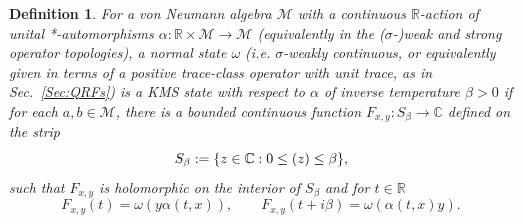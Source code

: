 \documentclass[sn-mathphys-num]{sn-jnl}%
\let\Im\relax
\DeclareMathOperator{\Im}{Im}
\newcommand{\CC}{\mathbb{C}}
\newcommand{\RR}{\mathbb{R}}
\newcommand{\MM}{\mathcal{M}}
\numberwithin{equation}{section}
\theoremstyle{thmstyleone}%
\theoremstyle{thmstyletwo}%
\theoremstyle{thmstylethree}%
\newtheorem{definition}[theorem]{Definition}%
\begin{document}
\begin{definition}
    For a von Neumann algebra $\mathcal{M}$ with a continuous $\RR$-action of  unital *-automorphisms  $\alpha:\RR\times\mathcal{M}\to\MM$ (equivalently in the ($\sigma$-)weak and strong operator topologies), a normal state $\omega$  (i.e. $\sigma$-weakly continuous, or equivalently given in terms of a positive trace-class operator with unit trace, as in Sec.~\ref{Sec:QRFs}) is a \emph{KMS state} with respect to $\alpha$ of inverse temperature $\beta>0$ if for each $a,b\in\MM$, there is a bounded continuous function $F_{x,y}:S_\beta\to\CC$ defined on the strip 
    \begin{equation}
        S_\beta:=\{z\in \CC: 0\leq\Im(z)\leq \beta\},
    \end{equation} such that $F_{x,y}$ is holomorphic on the interior of $S_\beta$ and for $t\in\RR$
\begin{equation}
    F_{x,y}(t)=\omega(y\alpha(t,x)),\qquad F_{x,y}(t+i\beta)=\omega(\alpha(t,x)y).
\end{equation}
\end{definition}
\end{document}
